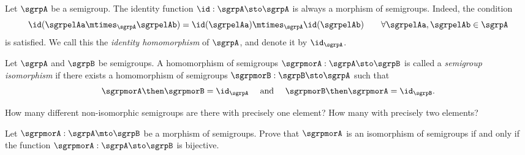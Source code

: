 \begin{definition}
  \label{def:identity-sgrp-mor}
Let $\sgrpA$ be a semigroup. The identity function $\id: \sgrpA \sto \sgrpA$ is always a morphism of semigroups. Indeed, the condition
\begin{equation}
\id (\sgrpelAa \mtimes_{\sgrpA} \sgrpelAb) = \id (\sgrpelAa) \mtimes_{\sgrpA} \id(\sgrpelAb) \quad \quad \forall \sgrpelAa, \sgrpelAb \in \sgrpA
\end{equation}
is satisfied. We call this the \emph{identity homomorphism} of $\sgrpA$, and denote it by $\id_\sgrpA$.
\end{definition}

\begin{definition}
  \label{def:semigroup-iso}
Let $\sgrpA$ and $\sgrpB$ be semigroups. A homomorphism of semigroups $\sgrpmorA: \sgrpA \sto \sgrpB$ is called a \emph{semigroup isomorphism} if there exists a homomorphism of semigroups $\sgrpmorB: \sgrpB \sto \sgrpA$ such that
\begin{equation}\label{sgrp-iso-cond}
\sgrpmorA \then \sgrpmorB = \id_\sgrpA \quad \text{ and } \quad  \sgrpmorB \then \sgrpmorA = \id_\sgrpB.
\end{equation}
\end{definition}

\begin{exercise}
How many different non-isomorphic semigroups are there with precisely one element? How many with precisely two elements?
\end{exercise}
\begin{solution}
\end{solution}

\begin{exercise}
Let $\sgrpmorA: \sgrpA \mto \sgrpB$ be a morphism of semigroups. Prove that $\sgrpmorA$ is an isomorphism of semigroups if and only if the function $\sgrpmorA: \sgrpA \sto \sgrpB$ is bijective.
\end{exercise}
\begin{solution}
\end{solution}




